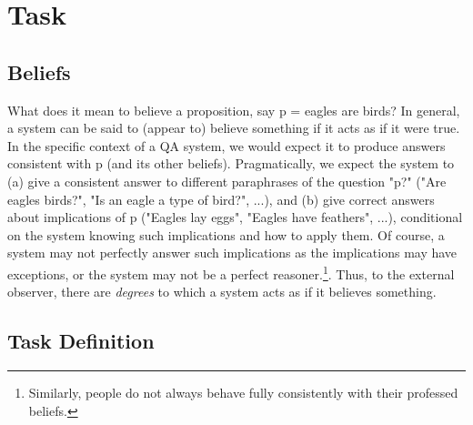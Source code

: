 \documentclass[11pt]{article}
\newcommand{\eat}[1]{}
\newcommand{\red}[1]{\textcolor{red}{#1}}
\begin{document}
\section{Task}

\subsection{Beliefs}

What does it mean to believe a proposition, say p = eagles are birds? In general, a system can
be said to (appear to) believe something if it acts as if it were true. In the specific
context of a QA system, we would expect it to produce answers consistent with p (and
its other beliefs). Pragmatically, we expect the system to (a) give a consistent answer to
different paraphrases of the question "p?" ("Are eagles birds?", "Is an eagle a type of bird?", ...),
and (b) give correct answers about implications of p ("Eagles lay eggs", "Eagles have feathers", ...),
conditional on the system knowing such implications and how to apply them.
Of course, a system may not perfectly answer such implications as the implications
may have exceptions, or the system may not be a perfect reasoner.\footnote{Similarly,
people do not always behave fully consistently with their professed beliefs.}.
Thus, to the external observer, there are {\it degrees} to which a system acts as if it
believes something.

\eat{
\red{Possibly delete this paragraph if too repetitive.} 
As has been shown elsewhere, language models (LM) can be inconsistent in their answers,
suggesting they have a rather weak notion of belief, in the sense described above.
To strengthen this, we add a dynamic memory component - the BeliefBank - on top of
the model to track and modify beliefs. We use the phrase ``the {\bf system}'' to refer
to the combined model plus belief bank. Our goal is to create a system with
a stronger notion of belief (i.e., more consistent and accurate) than the underlying LM inside it.
}

\subsection{Task Definition}
\end{document}
